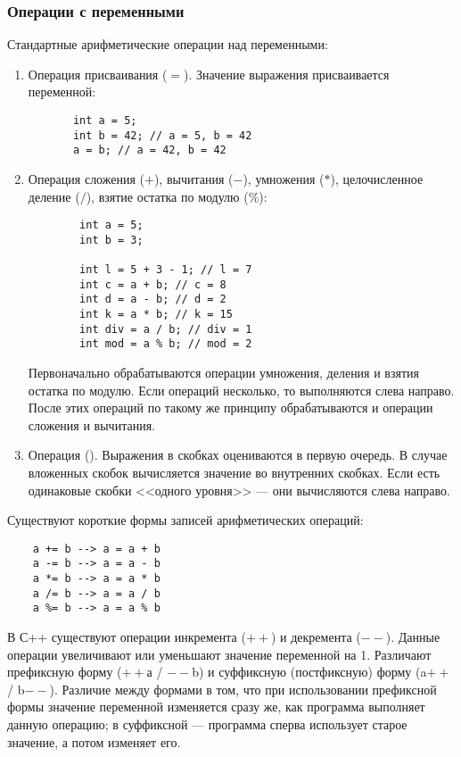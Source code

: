 \subsubsection{Операции с переменными}
Стандартные арифметические операции над переменными:
\begin{enumerate}
    \item Операция присваивания ($=$). Значение выражения присваивается переменной:
    \begin{lstlisting}
       int a = 5;
       int b = 42; // a = 5, b = 42
       a = b; // a = 42, b = 42
    \end{lstlisting}
    \item Операция сложения ($+$), вычитания ($-$), умножения ($*$), целочисленное деление ($/$), взятие остатка по модулю ($\%$):
    \begin{lstlisting}
        int a = 5;
        int b = 3;

        int l = 5 + 3 - 1; // l = 7
        int c = a + b; // c = 8
        int d = a - b; // d = 2
        int k = a * b; // k = 15
        int div = a / b; // div = 1
        int mod = a % b; // mod = 2
    \end{lstlisting}

    Первоначально обрабатываются операции умножения, деления и взятия остатка по модулю. Если операций несколько, то выполняются слева направо. После этих операций по такому же принципу обрабатываются и операции сложения и вычитания.

    \item Операция (). Выражения в скобках оцениваются в первую очередь. В случае вложенных скобок вычисляется значение во внутренних скобках. Если есть одинаковые скобки <<одного уровня>> --- они вычисляются слева направо.
\end{enumerate}

Существуют короткие формы записей арифметических операций:
\begin{lstlisting}
    a += b --> a = a + b
    a -= b --> a = a - b
    a *= b --> a = a * b
    a /= b --> a = a / b
    a %= b --> a = a % b
\end{lstlisting}

В С++ существуют операции инкремента ($++$) и декремента ($--$). Данные операции увеличивают или уменьшают значение переменной на 1. Различают префиксную форму ($++$а / $--$b) и суффиксную (постфиксную) форму (a$++$ / b$--$). Различие между формами в том, что при использовании префиксной формы значение переменной изменяется сразу же, как программа выполняет данную операцию; в суффиксной --- программа сперва использует старое значение, а потом изменяет его.

